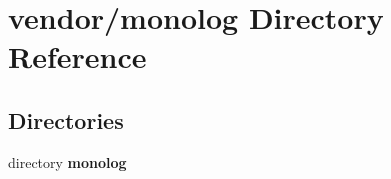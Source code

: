 \section{vendor/monolog Directory Reference}
\label{dir_8cd172d4fe23c98f5add74804f6e72c7}
\subsection*{Directories}
\begin{DoxyCompactItemize}
\item 
directory {\bf monolog}
\end{DoxyCompactItemize}
